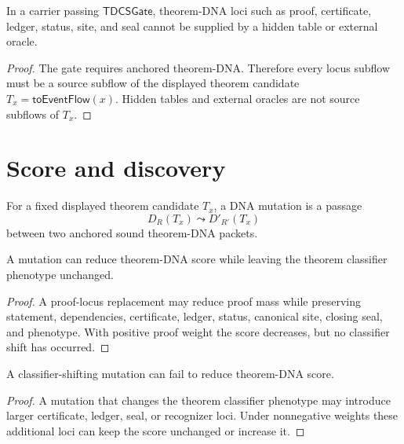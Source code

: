 \begin{theorem}
\label{thm:tdcs-anchoring-prevents-locus-hiding}
In a carrier passing $\mathsf{TDCSGate}$, theorem-DNA loci such as proof,
certificate, ledger, status, site, and seal cannot be supplied by a hidden
table or external oracle.
\end{theorem}
\begin{proof}
The gate requires anchored theorem-DNA. Therefore every locus subflow must be a
source subflow of the displayed theorem candidate $T_x=\mathsf{toEventFlow}(x)$.
Hidden tables and external oracles are not source subflows of $T_x$.
\end{proof}

\section{Score and discovery}
\label{sec:tdcs-score-and-discovery}

\begin{definition}
\label{def:tdcs-dna-mutation}
For a fixed displayed theorem candidate $T_x$, a DNA mutation is a passage
$$
D_R(T_x)\leadsto D'_{R'}(T_x)
$$
between two anchored sound theorem-DNA packets.
\end{definition}

\begin{theorem}
\label{thm:tdcs-complexity-reduction-not-discovery}
A mutation can reduce theorem-DNA score while leaving the theorem classifier
phenotype unchanged.
\end{theorem}
\begin{proof}
A proof-locus replacement may reduce proof mass while preserving statement,
dependencies, certificate, ledger, status, canonical site, closing seal, and
phenotype. With positive proof weight the score decreases, but no classifier
shift has occurred.
\end{proof}

\begin{theorem}
\label{thm:tdcs-classifier-shift-need-not-reduce-score}
A classifier-shifting mutation can fail to reduce theorem-DNA score.
\end{theorem}
\begin{proof}
A mutation that changes the theorem classifier phenotype may introduce larger
certificate, ledger, seal, or recognizer loci. Under nonnegative weights these
additional loci can keep the score unchanged or increase it.
\end{proof}

